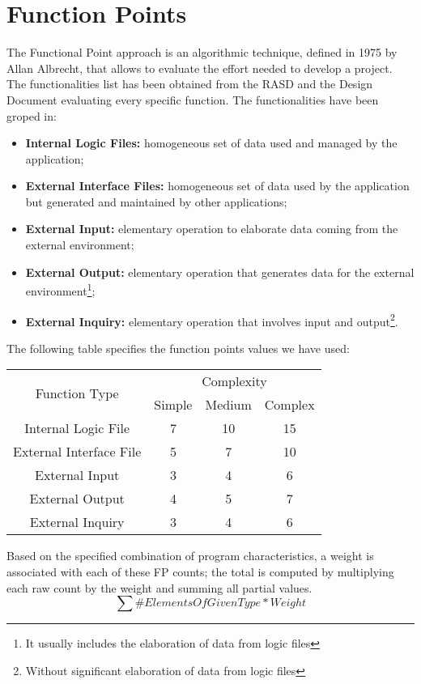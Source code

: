\section{Function Points}
The Functional Point approach is an algorithmic technique, defined in 1975 by Allan Albrecht, that allows to evaluate the effort needed to develop a project. The functionalities list has been obtained from the RASD and the Design Document evaluating every specific function.
The functionalities have been groped in:
\begin{itemize}
	\item \textbf{Internal Logic Files:} homogeneous set of data used and managed by the application;
	\item \textbf{External Interface Files:} homogeneous set of data used by the application but generated and maintained by other applications;
	\item \textbf{External Input:} elementary operation to elaborate data coming from the external environment;
	\item \textbf{External Output:} elementary operation that generates data for the external environment\footnote{It usually includes the elaboration of data from logic files};
	\item \textbf{External Inquiry:} elementary operation that involves input and output\footnote{Without significant elaboration of data from logic files}.
\end{itemize}
The following table specifies the function points values we have used:

\begin{tabular}{|c|c|c|c|}\hline
	\multirow{2}{*}{Function Type} & \multicolumn{3}{c|}{Complexity} \\ \cline{2-4}
	 & Simple & Medium & Complex \\ \hline
	Internal Logic File	& 7 & 10 & 15 \\ \hline
	External Interface File	& 5 & 7 & 10 \\ \hline
	External Input	& 3 & 4 & 6 \\ \hline
	External Output	& 4 & 5 & 7 \\ \hline
	External Inquiry& 3 & 4 & 6 \\ \hline
\end{tabular} 

Based on the specified combination of program characteristics, a weight is associated with each of these FP counts; the total is computed by multiplying each raw count by the weight and summing all partial values.
$$\sum \#ElementsOfGivenType * Weight$$
